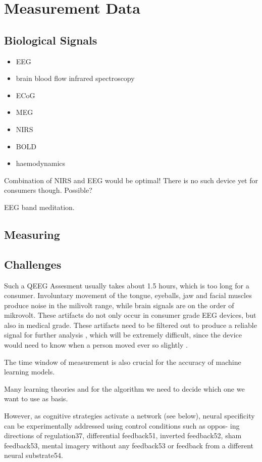 \documentclass{llncs} %
\begin{document}
\section{Measurement Data}
\subsection{Biological Signals}
\begin{itemize}
    \item EEG
    \item brain blood flow infrared spectroscopy
    \item ECoG
    \item MEG 
    \item NIRS
    \item BOLD
    \item haemodynamics
\end{itemize}
Combination of NIRS and EEG would be optimal! There is no such device yet for consumers though.
Possible?

EEG band meditation.

\subsection{Measuring}
\subsection{Challenges}
Such a QEEG Assesment usually takes about 1.5 hours, which is too long for a consumer.
Involuntary movement of the tongue, eyeballs, jaw and facial muscles produce noise in the milivolt range, while brain signals are on 
the order of mikrovolt. These artifacts do not only occur in consumer grade EEG devices, but also in medical grade.
These artifacts need to be filtered out to produce a reliable signal for further analysis \cite{Bashivan: et al}, which will be extremely difficult, since the device would need to know when a person moved ever so slightly \cite{Hammond}.

The time window of measurement is also crucial for the accuracy of machine learning models. \cite{Bashivan: et al}


Many learning theories and for the algorithm we need to decide which one we want to use as basis. 

However, as cognitive strategies activate a network (see below), neural specificity can be experimentally addressed using control conditions such as oppos- ing directions of regulation37, differential feedback51, inverted feedback52, sham feedback53, mental imagery without any feedback53 or feedback from a different neural substrate54. \cite{Sitaram}
\end{document}
